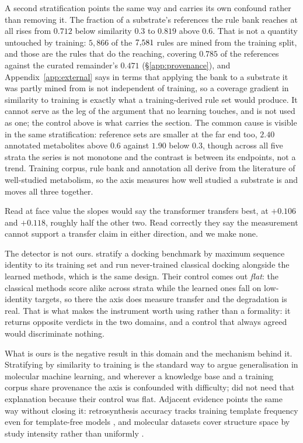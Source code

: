 A second stratification points the same way and carries its own confound rather than removing it.
The fraction of a substrate's references the rule bank reaches at all rises from $0.712$ below
similarity $0.3$ to $0.819$ above $0.6$. That is not a quantity untouched by training: $5{,}866$ of
the $7{,}581$ rules are mined from the training split, and those are the rules that do the reaching,
covering $0.785$ of the references against the curated remainder's $0.471$ (\S\ref{app:provenance}), and
Appendix~\ref{app:external} says in terms that applying the bank to a substrate it was partly mined
from is not independent of training, so a coverage gradient in similarity to training is exactly
what a training-derived rule set would produce. It cannot serve as the leg of the argument that no
learning touches, and is not used as one; the control above is what carries the section. The common cause is visible in the
same stratification: reference sets are smaller at the far end too, $2.40$ annotated metabolites
above $0.6$ against $1.90$ below $0.3$, though across all five strata the series is not monotone
and the contrast is between its endpoints, not a trend. Training corpus, rule bank and annotation all derive from the
literature of well-studied metabolism, so the axis measures how well studied a substrate is and
moves all three together.

Read at face value the slopes would say the transformer transfers best, at $+0.106$ and $+0.118$,
roughly half the other two. Read correctly they say the measurement cannot support a transfer claim
in either direction, and we make none.

The detector is not ours. \citet{Buttenschoen_2024} stratify a docking benchmark by maximum
sequence identity to its training set and run never-trained classical docking alongside the learned
methods, which is the same design. Their control comes out \emph{flat}: the classical methods score
alike across strata while the learned ones fall on low-identity targets, so there the axis does
measure transfer and the degradation is real. That is what makes the instrument worth using rather
than a formality: it returns opposite verdicts in the two domains, and a control that always
agreed would discriminate nothing.

What is ours is the negative result in this domain and the mechanism behind it. Stratifying by
similarity to training is the standard way to argue generalisation in molecular machine learning,
and wherever a knowledge base and a training corpus share provenance the axis is confounded with
difficulty; \citet{Buttenschoen_2024} did not need that explanation because their control was flat.
Adjacent evidence points the same way without closing it: retrosynthesis accuracy tracks training
template frequency even for template-free models \citep{Tanovic_2026}, and molecular datasets cover
structure space by study intensity rather than uniformly \citep{Kretschmer_2025}.


